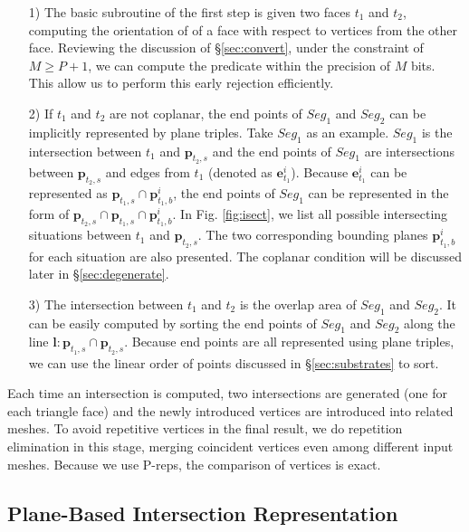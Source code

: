 \documentclass[10pt,journal,compsoc]{IEEEtran}
\begin{document}
\begin{itemize}[leftmargin=0.45cm]
  \item[1)] The basic subroutine of the first step is given two faces $t_1$ and $t_2$, computing the orientation of of a face with respect to vertices from the other face. Reviewing the discussion of \S \ref{sec:convert}, under the constraint of $M \ge P+1$, we can compute the predicate within the precision of $M$ bits. This allow us to perform this early rejection efficiently.
      \vspace{0.5em}
  \item[2)] If $t_1$ and $t_2$ are not coplanar, the end points of $Seg_1$ and $Seg_2$ can be implicitly represented by plane triples. Take $Seg_1$ as an example. $Seg_1$ is the intersection between $t_1$ and $\bm{p}_{t_2, s}$ and the end points of $Seg_1$ are intersections between $\bm{p}_{t_2, s}$ and edges from $t_1$ (denoted as $\bm{e}^i_{t_1}$). Because $\bm{e}^i_{t_1}$ can be represented as $\bm{p}_{t_1, s}\cap \bm{p}^i_{t_1, b}$, the end points of $Seg_1$ can be represented in the form of $\bm{p}_{t_2, s} \cap \bm{p}_{t_1, s} \cap \bm{p}^i_{t_1, b}$. In Fig. \ref{fig:isect}, we list all possible intersecting situations between $t_1$ and $\bm{p}_{t_2, s}$. The two corresponding bounding planes $\bm{p}^i_{t_1, b}$ for each situation are also presented. The coplanar condition will be discussed later in \S \ref{sec:degenerate}.
      \vspace{0.5em}
 \item[3)] The intersection between $t_1$ and $t_2$ is the overlap area of $Seg_1$ and $Seg_2$. It can be easily computed by sorting the end points of $Seg_1$ and $Seg_2$ along the line $\bm{l}\colon \bm{p}_{t_1, s} \cap \bm{p}_{t_2, s}$. Because end points are all represented using plane triples, we can use the linear order of points discussed in \S \ref{sec:substrates} to sort.
\end{itemize}

Each time an intersection is computed, two intersections are generated (one for each triangle face) and the newly introduced vertices are introduced into related meshes. To avoid repetitive vertices in the final result, we do repetition elimination in this stage, merging coincident vertices even among different input meshes. Because we use P-reps, the comparison of vertices is exact.

\subsection{Plane-Based Intersection Representation}
\label{sec:ir}
\end{document}
